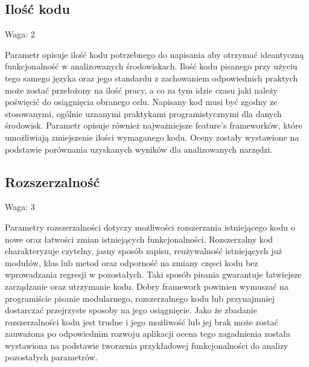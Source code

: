 \documentclass[12pt]{report}
\begin{document}
    \subsection{Ilość kodu}
      \begin{description}
        \item Waga: 2
      \end{description}
      Parametr opisuje ilość kodu potrzebnego do napisania aby otrzymać ideantyczną funkcjonalność w analizowanych środowiskach.
      Ilość kodu pisanego przy użyciu tego samego języka oraz jego standardu z zachowaniem odpowiednich praktych może zostać przełożony na ilość pracy, a co za tym idzie czasu jaki należy poświęcić do osiągnięcia obranego celu.
      Napisany kod musi być zgodny ze stosowanymi, ogólnie uznanymi praktykami programistycznymi dla danych środowisk.
      Parametr opisuje również najważniejsze feature's frameworków, które umożliwiają zmiejszenie ilości wymaganego kodu.
      Oceny zostały wystawione na podstawie porównania uzyskanych wyników dla analizowanych narzędzi.

    \subsection{Rozszerzalność}
      \begin{description}
        \item Waga: 3
      \end{description}
      Parametry rozszerzalności dotyczy możliwości rozszerzania istniejącego kodu o nowe oraz łatwości zmian istniejących funkcjonalności.
      Rozszerzalny kod charakteryzuje czytelny, jasny sposób zapisu, reużywalność istniejących już modułów, klas lub metod oraz odporność na zmiany częsci kodu bez wprowadzania regresji w pozostałych.
      Taki sposób pisania gwarantuje łatwiejsze zarządzanie oraz utrzymanie kodu.
      Dobry framework powinien wymuszać na programiście pisanie modularnego, rozszerzalnego kodu lub przynajmniej dostarczać przejrzyste sposoby na jego osiągnięcie.
      Jako że zbadanie rozszerzalności kodu jest trudne i jego możliwość lub jej brak może zostać zauważona po odpowiednim rozwoju aplikacji ocena tego zagadnienia została wystawiona na podstawie tworzenia przykładowej funkcjonalności do analizy pozostałych parametrów.
\end{document}
